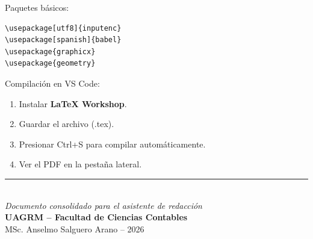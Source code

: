 \documentclass[12pt,a4paper]{article}
\begin{document}
Paquetes básicos:
\begin{verbatim}
\usepackage[utf8]{inputenc}
\usepackage[spanish]{babel}
\usepackage{graphicx}
\usepackage{geometry}
\end{verbatim}

Compilación en VS Code:
\begin{enumerate}
    \item Instalar \textbf{LaTeX Workshop}.
    \item Guardar el archivo (.tex).
    \item Presionar Ctrl+S para compilar automáticamente.
    \item Ver el PDF en la pestaña lateral.
\end{enumerate}

\vfill
\begin{center}
\rule{0.6\textwidth}{0.4pt}\\[0.3cm]
\textit{Documento consolidado para el asistente de redacción}\\[0.2cm]
\textbf{UAGRM -- Facultad de Ciencias Contables}\\[0.2cm]
MSc. Anselmo Salguero Arano -- 2026
\end{center}
\end{document}
